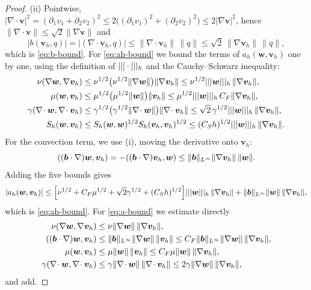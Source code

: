 \begin{proof}
(ii) Pointwise, $|\nabla\!\cdot\bm v|^2=(\partial_1v_1+\partial_2v_2)^2\le2\bigl((\partial_1v_1)^2+(\partial_2v_2)^2\bigr)\le2|\nabla\bm v|^2$, hence $\|\nabla\!\cdot\bm v\|\le\sqrt2\|\nabla\bm v\|$ and
\[
|b(\bm v_h,q)|=|(\nabla\!\cdot\bm v_h,q)|\le\|\nabla\!\cdot\bm v_h\|\,\|q\|\le\sqrt2\,\|\nabla\bm v_h\|\,\|q\|,
\]
which is \eqref{eq:b-bound}. For \eqref{eq:ah-bound} we bound the terms of $a_h(\bm w,\bm v_h)$ one by one, using the definition of $|||\cdot|||_h$ and the Cauchy--Schwarz inequality:
\[
\begin{aligned}
\nu(\nabla\bm w,\nabla\bm v_h)&\le\nu^{1/2}\bigl(\nu^{1/2}\|\nabla\bm w\|\bigr)\|\nabla\bm v_h\|\le\nu^{1/2}|||\bm w|||_h\,\|\nabla\bm v_h\|,\\
\mu(\bm w,\bm v_h)&\le\mu^{1/2}\bigl(\mu^{1/2}\|\bm w\|\bigr)\|\bm v_h\|\le\mu^{1/2}|||\bm w|||_h\,C_F\|\nabla\bm v_h\|,\\
\gamma(\nabla\!\cdot\bm w,\nabla\!\cdot\bm v_h)&\le\gamma^{1/2}\bigl(\gamma^{1/2}\|\nabla\!\cdot\bm w\|\bigr)\|\nabla\!\cdot\bm v_h\|\le\sqrt2\,\gamma^{1/2}|||\bm w|||_h\,\|\nabla\bm v_h\|,\\
S_h(\bm w,\bm v_h)&\le S_h(\bm w,\bm w)^{1/2}S_h(\bm v_h,\bm v_h)^{1/2}\le(C_Sh)^{1/2}|||\bm w|||_h\,\|\nabla\bm v_h\|.
\end{aligned}
\]
For the convection term, we use (i), moving the derivative onto $\bm v_h$:
\[
((\boldsymbol b\cdot\nabla)\bm w,\bm v_h)=-((\boldsymbol b\cdot\nabla)\bm v_h,\bm w)\le\|\boldsymbol b\|_{L^\infty}\|\nabla\bm v_h\|\,\|\bm w\|.
\]
Adding the five bounds gives
\[
|a_h(\bm w,\bm v_h)|\le\Bigl[\nu^{1/2}+C_F\mu^{1/2}+\sqrt2\gamma^{1/2}+(C_Sh)^{1/2}\Bigr]|||\bm w|||_h\,\|\nabla\bm v_h\|+\|\boldsymbol b\|_{L^\infty}\|\bm w\|\,\|\nabla\bm v_h\|,
\]
which is \eqref{eq:ah-bound}. For \eqref{eq:a-bound} we estimate directly
\[
\begin{aligned}
\nu(\nabla\bm w,\nabla\bm v_h)&\le\nu\|\nabla\bm w\|\,\|\nabla\bm v_h\|,\\
((\boldsymbol b\cdot\nabla)\bm w,\bm v_h)&\le\|\boldsymbol b\|_{L^\infty}\|\nabla\bm w\|\,\|\bm v_h\|\le C_F\|\boldsymbol b\|_{L^\infty}\|\nabla\bm w\|\,\|\nabla\bm v_h\|,\\
\mu(\bm w,\bm v_h)&\le\mu\|\bm w\|\,\|\bm v_h\|\le C_F\mu\|\bm w\|\,\|\nabla\bm v_h\|,\\
\gamma(\nabla\!\cdot\bm w,\nabla\!\cdot\bm v_h)&\le\gamma\|\nabla\!\cdot\bm w\|\,\|\nabla\!\cdot\bm v_h\|\le2\gamma\|\nabla\bm w\|\,\|\nabla\bm v_h\|,
\end{aligned}
\]
and add.
\end{proof}

